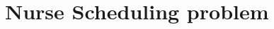 \documentclass[../../thesis.tex]{subfiles}
\begin{document}
\section{Nurse Scheduling problem}
\end{document}
